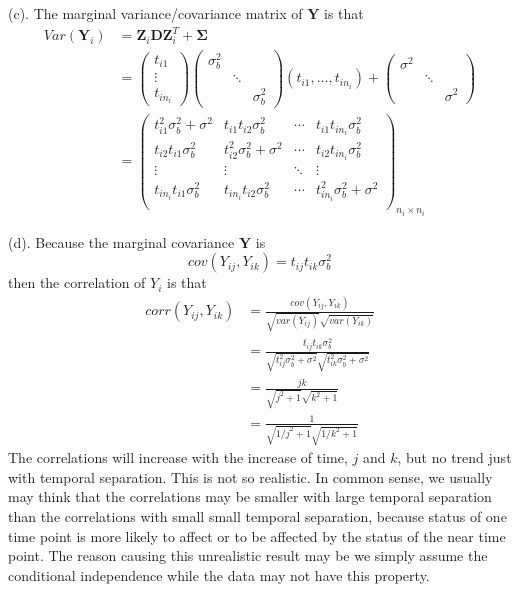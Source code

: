 \documentclass[letterpaper, 12pt]{article}
\newcommand{\ba}{$$\begin{aligned}}
\newcommand{\ea}{\end{aligned}$$}
\begin{document}
(c). The marginal variance/covariance matrix of $\bm{Y}$ is that
\ba
Var(\bm{Y}_i)&=\bm{Z}_i\bm{DZ}_i^T+\bm{\Sigma}\\
&=\left(\begin{matrix}
t_{i1}\\
\vdots\\
t_{in_i}\end{matrix}\right)
\left(\begin{matrix}
\sigma_b^2\\
&\ddots\\
&&\sigma_b^2\end{matrix}\right)
(t_{i1},\dots,t_{in_i})+\left(\begin{matrix}
\sigma^2\\
&\ddots\\
&&\sigma^2\end{matrix}\right)\\
&=\left(\begin{matrix}
t_{i1}^2\sigma_b^2+\sigma^2&t_{i1}t_{i2}\sigma_b^2&\cdots&t_{i1}t_{in_i}\sigma_b^2\\
t_{i2}t_{i1}\sigma_b^2&t_{i2}^2\sigma_b^2+\sigma^2&\cdots&t_{i2}t_{in_i}\sigma_b^2\\
\vdots&\vdots&\ddots&\vdots\\
t_{in_i}t_{i1}\sigma_b^2&t_{in_i}t_{i2}\sigma_b^2&\cdots&t_{in_i}^2\sigma_b^2+\sigma^2\\
\end{matrix}\right)_{n_i\times n_i}
\ea


(d). Because the marginal covariance $\bm{Y}$ is
$$
cov(Y_{ij},Y_{ik})=t_{ij}t_{ik}\sigma_b^2
$$
then the correlation of $Y_i$ is that 
\ba
corr(Y_{ij},Y_{ik})&=\frac{cov(Y_{ij},Y_{ik})}{\sqrt{var(Y_{ij})}\sqrt{var(Y_{ik})}}\\
&=\frac{t_{ij}t_{ik}\sigma_b^2}{\sqrt{t_{ij}^2\sigma_b^2+\sigma^2}\sqrt{t_{ik}^2\sigma_b^2+\sigma^2}}\\
&=\frac{jk}{\sqrt{j^2+1}\sqrt{k^2+1}}\\
&=\frac{1}{\sqrt{1/j^2+1}\sqrt{1/k^2+1}}
\ea
The correlations will increase with the increase of time, $j$ and $k$, but no trend just with temporal separation. This is not so realistic. In common sense, we usually may think that the correlations may be smaller with large temporal separation than the correlations with small small temporal separation, because status of one time point is more likely to affect or to be affected by the status of the near time point. The reason causing this unrealistic result may be we simply assume the conditional independence while the data may not have this property.
\end{document}
